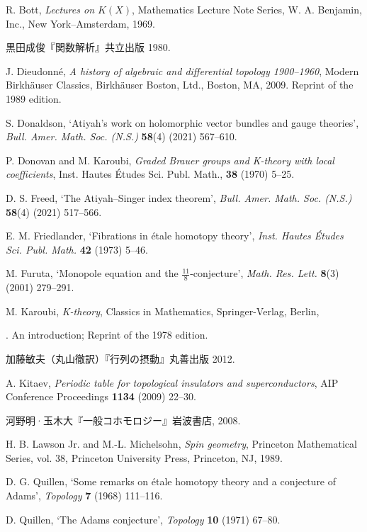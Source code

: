 \noindent [34] R. Bott, \textit{Lectures on $K(X)$}, Mathematics Lecture Note Series, W. A. Benjamin, Inc., New York--Amsterdam, 1969.

\noindent [35] 黒田成俊『関数解析』共立出版 1980.

\noindent [36] J. Dieudonné, \textit{A history of algebraic and differential topology 1900--1960}, Modern Birkhäuser Classics, Birkhäuser Boston, Ltd., Boston, MA, 2009. Reprint of the 1989 edition.

\noindent [37] S. Donaldson, `Atiyah's work on holomorphic vector bundles and gauge theories', \textit{Bull. Amer. Math. Soc. (N.S.)} \textbf{58}(4) (2021) 567--610.

\noindent [38] P. Donovan and M. Karoubi, \textit{Graded Brauer groups and K-theory with local coefficients}, Inst. Hautes Études Sci. Publ. Math., \textbf{38} (1970) 5--25.

\noindent [39] D. S. Freed, `The Atiyah--Singer index theorem', \textit{Bull. Amer. Math. Soc. (N.S.)} \textbf{58}(4) (2021) 517--566.

\noindent [40] E. M. Friedlander, `Fibrations in étale homotopy theory', \textit{Inst. Hautes Études Sci. Publ. Math.} \textbf{42} (1973) 5--46.

\noindent [41] M. Furuta, `Monopole equation and the $\frac{11}{8}$-conjecture', \textit{Math. Res. Lett.} \textbf{8}(3) (2001) 279--291.

\noindent [42] M. Karoubi, \textit{K-theory}, Classics in Mathematics, Springer-Verlag, Berlin,

. An introduction; Reprint of the 1978 edition.

\noindent [43] 加藤敏夫（丸山徹訳）『行列の摂動』丸善出版 2012.

\noindent [44] A. Kitaev, \textit{Periodic table for topological insulators and superconductors}, AIP Conference Proceedings \textbf{1134} (2009) 22--30.

\noindent [45] 河野明·玉木大『一般コホモロジー』岩波書店, 2008.

\noindent [46] H. B. Lawson Jr. and M.-L. Michelsohn, \textit{Spin geometry}, Princeton Mathematical Series, vol. 38, Princeton University Press, Princeton, NJ, 1989.

\noindent [47] D. G. Quillen, `Some remarks on étale homotopy theory and a conjecture of Adams', \textit{Topology} \textbf{7} (1968) 111--116.

\noindent [48] D. Quillen, `The Adams conjecture', \textit{Topology} \textbf{10} (1971) 67--80.

